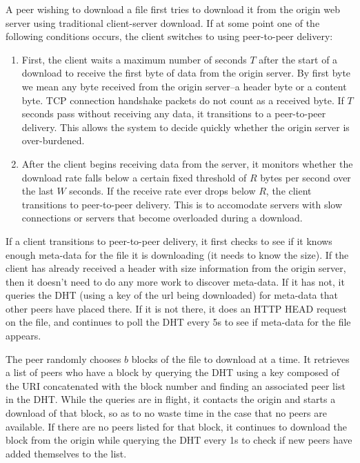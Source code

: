 A peer wishing to download a file first tries to download it from the origin web server using traditional client-server download.  If at some point one of the following conditions occurs, the client switches to using 
peer-to-peer delivery:
\begin{enumerate}
\item First, the client waits a maximum number of seconds $T$ after the start of a download to receive the first byte of data from the origin server.  
By first byte we mean any byte received from the origin server--a header byte or a content byte.  TCP connection handshake packets do not count as a received byte.
If $T$ seconds pass without receiving any data, it transitions to a peer-to-peer delivery.  This allows the system to decide quickly whether the origin server is over-burdened.   
\item After the client begins receiving data from the server, it monitors whether the download rate falls below a certain fixed 
threshold of $R$ bytes per second over the last $W$ seconds.  If the receive rate ever drops below $R$, the client transitions to peer-to-peer delivery.  
This is to accomodate servers with slow connections or servers that become overloaded during a download.
\end{enumerate}

If a client transitions to peer-to-peer delivery, it first checks to see if it knows enough meta-data for the file it is downloading (it needs to know the size).
If the client has already received a header with size information from the origin server, then it doesn't need to do any more work to discover meta-data.  If it has not, it
queries the DHT (using a key of the url being downloaded) for meta-data that other peers have placed there.  If it is not there, it does an HTTP HEAD request on the file, and continues
to poll the DHT every 5s to see if meta-data for the file appears.  

The peer randomly chooses $b$ blocks of the file to download at a time.  It retrieves a list of peers who have a block by querying the DHT using a key composed of
the URI concatenated with the block number and finding an associated peer list in the DHT.  While the queries are in flight, it contacts the origin and starts a download of that block, so as to no waste time in the case that no peers are available.
If there are no peers listed for that block, it continues to download the block from the origin while querying the DHT every 1s to check if new peers have added themselves to the list.

